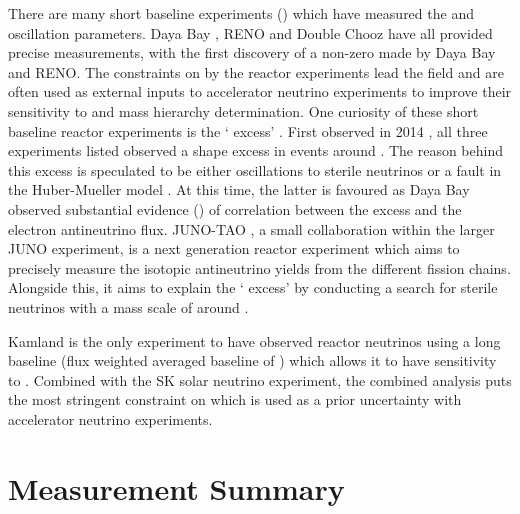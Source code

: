     
There are many short baseline experiments () which have measured the \sinsqreac and \delmsqatm oscillation parameters. Daya Bay \cite{PhysRevLett.108.171803}, RENO \cite{PhysRevLett.108.191802} and Double Chooz \cite{PhysRevLett.108.131801} have all provided precise measurements, with the first discovery of a non-zero  made by Daya Bay and RENO. The constraints on \sinsqreac by the reactor experiments lead the field and are often used as external inputs to accelerator neutrino experiments to improve their sensitivity to \dcp and mass hierarchy determination. One curiosity of these short baseline reactor experiments is the ` excess' \cite{Berryman_2019}. First observed in 2014 \cite{For_the_RENO_Collaboration2015-zy, Abe_2014}, all three experiments listed observed a shape excess in events around . The reason behind this excess is speculated to be either oscillations to sterile neutrinos or a fault in the Huber-Mueller model \cite{Mueller_2011}. At this time, the latter is favoured as Daya Bay \cite{PhysRevLett.123.111801} observed substantial evidence (\quickmath{4.0\sigma}) of correlation between the excess and the  electron antineutrino flux.
JUNO-TAO \cite{junocollaboration2020tao}, a small collaboration within the larger JUNO experiment, is a next generation reactor experiment which aims to precisely measure the isotopic antineutrino yields from the different fission chains. Alongside this, it aims to explain the ` excess' by conducting a search for sterile neutrinos with a mass scale of around .

Kamland \cite{Decowski2016-hh} is the only experiment to have observed reactor neutrinos using a long baseline (flux weighted averaged baseline of ) which allows it to have sensitivity to \delmsqsol. Combined with the SK solar neutrino experiment, the combined analysis puts the most stringent constraint on \delmsqsol \cite{PhysRevD.83.052002} which is used as a prior uncertainty with accelerator neutrino experiments.

\section{Measurement Summary}
\label{sec:NeutrinoOscillationPhysics_MeasurementSummary}
